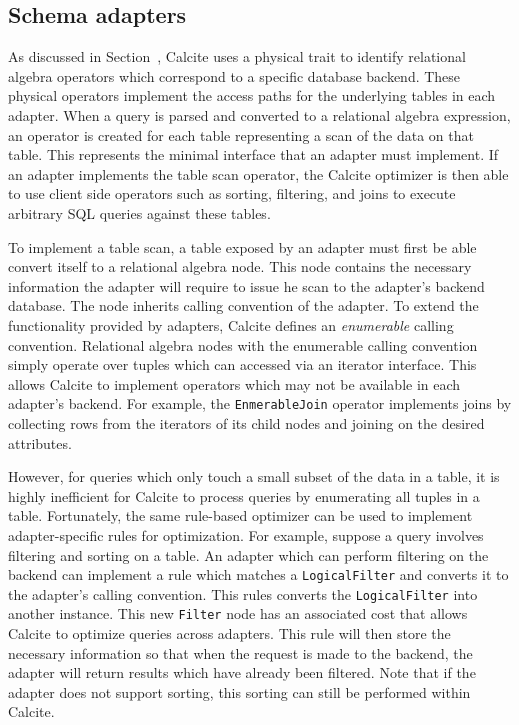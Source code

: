 \subsection{Schema adapters}
\label{subsec:adapters}

As discussed in Section~, Calcite uses a physical trait to identify relational algebra operators which correspond to a specific database backend.
These physical operators implement the access paths for the underlying tables in each adapter.
When a query is parsed and converted to a relational algebra expression, an operator is created for each table representing a scan of the data on that table.
This represents the minimal interface that an adapter must implement.
If an adapter implements the table scan operator, the Calcite optimizer is then able to use client side operators such as sorting, filtering, and joins to execute arbitrary SQL queries against these tables.

To implement a table scan, a table exposed by an adapter must first be able convert itself to a relational algebra node.
This node contains the necessary information the adapter will require to issue he scan to the adapter's backend database.
The node inherits calling convention of the adapter.
To extend the functionality provided by adapters, Calcite defines an \emph{enumerable} calling convention.
Relational algebra nodes with the enumerable calling convention simply operate over tuples which can accessed via an iterator interface.
This allows Calcite to implement operators which may not be available in each adapter's backend.
For example, the \texttt{EnmerableJoin} operator implements joins by collecting rows from the iterators of its child nodes and joining on the desired attributes.

However, for queries which only touch a small subset of the data in a table, it is highly inefficient for Calcite to process queries by enumerating all tuples in a table.
Fortunately, the same rule-based optimizer can be used to implement adapter-specific rules for optimization.
For example, suppose a query involves filtering and sorting on a table.
An adapter which can perform filtering on the backend can implement a rule which matches a \texttt{LogicalFilter} and converts it to the adapter's calling convention.
This rules converts the \texttt{LogicalFilter} into another  instance.
This new \texttt{Filter} node has an associated cost that allows Calcite to optimize queries across adapters.
This rule will then store the necessary information so that when the request is made to the backend, the adapter will return results which have already been filtered.
Note that if the adapter does not support sorting, this sorting can still be performed within Calcite.


